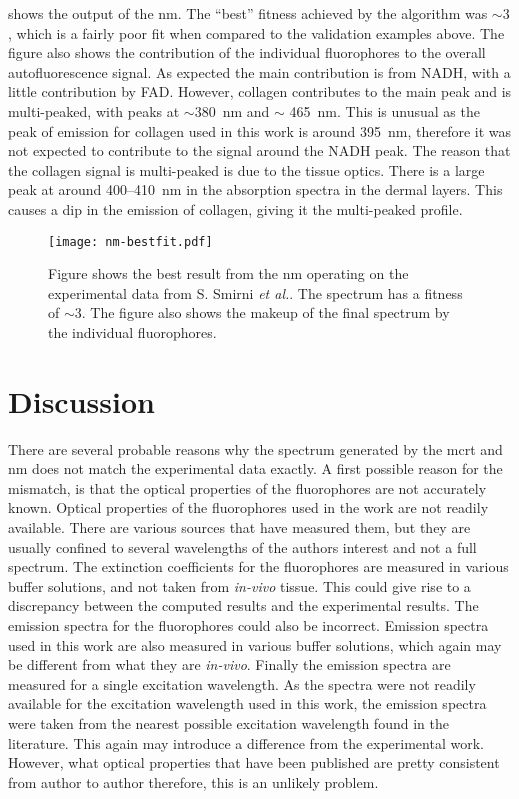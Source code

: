  shows the output of the \gls*{nm}.
The ``best'' fitness achieved by the algorithm was $\sim3$, which is a fairly poor fit when compared to the validation examples above.
The figure also shows the contribution of the individual fluorophores to the overall autofluorescence signal.
As expected the main contribution is from NADH, with a little contribution by FAD\@.
However, collagen contributes to the main peak and is multi-peaked, with peaks at $\sim$380~nm and $\sim$ 465~nm.
This is unusual as the peak of emission for collagen used in this work is around 395~nm, therefore it was not expected to contribute to the signal around the NADH peak.
The reason that the collagen signal is multi-peaked is due to the tissue optics.
There is a large peak at around 400--410~nm in the absorption spectra in the dermal layers.
This causes a dip in the emission of collagen, giving it the multi-peaked profile.

\begin{figure}[!htpb]
  \centering
  \texttt{[image: nm-bestfit.pdf]}
  \caption{Figure shows the best result from the \gls*{nm} operating on the experimental data from S. Smirni \textit{et al.}. The spectrum has a fitness of $\sim 3$. The figure also shows the makeup of the final spectrum by the individual fluorophores.}
  \label{fig:bestNMresult}
\end{figure}

\section{Discussion}

There are several probable reasons why the spectrum generated by the \gls*{mcrt} and \gls*{nm} does not match the experimental data exactly.
A first possible reason for the mismatch, is that the optical properties of the fluorophores are not accurately known.
Optical properties of the fluorophores used in the work are not readily available.
There are various sources that have measured them, but they are usually confined to several wavelengths of the authors interest and not a full spectrum.
The extinction coefficients for the fluorophores are measured in various buffer solutions, and not taken from \textit{in-vivo} tissue.
This could give rise to a discrepancy between the computed results and the experimental results.
The emission spectra for the fluorophores could also be incorrect.
Emission spectra used in this work are also measured in various buffer solutions, which again may be different from what they are \textit{in-vivo}.
Finally the emission spectra are measured for a single excitation wavelength.
As the spectra were not readily available for the excitation wavelength used in this work, the emission spectra were taken from the nearest possible excitation wavelength found in the literature. This again may introduce a difference from the experimental work.
However, what optical properties that have been published are pretty consistent from author to author therefore, this is an unlikely problem.

